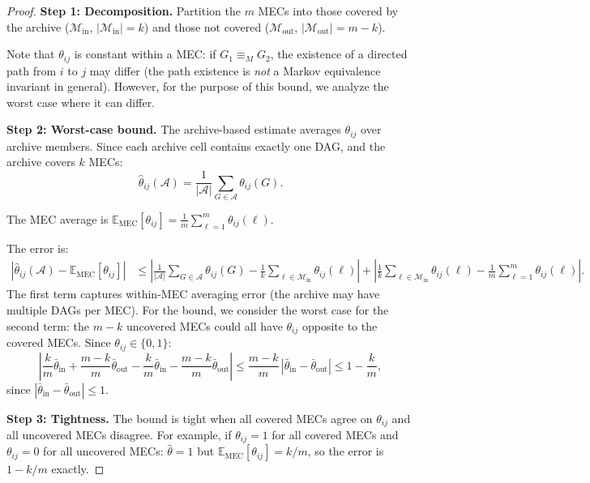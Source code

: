 \documentclass{article}
\theoremstyle{definition}
\theoremstyle{plain}
\theoremstyle{remark}
\begin{document}
\begin{proof}
\textbf{Step 1: Decomposition.}
Partition the $m$ MECs into those covered by the archive ($\mathcal{M}_{\text{in}}$,
$|\mathcal{M}_{\text{in}}| = k$) and those not covered
($\mathcal{M}_{\text{out}}$, $|\mathcal{M}_{\text{out}}| = m - k$).

Note that $\theta_{ij}$ is constant within a MEC: if $G_1 \equiv_M G_2$, the
existence of a directed path from $i$ to $j$ may differ (the path existence is
\emph{not} a Markov equivalence invariant in general). However, for the purpose
of this bound, we analyze the worst case where it can differ.

\textbf{Step 2: Worst-case bound.}
The archive-based estimate averages $\theta_{ij}$ over archive members. Since
each archive cell contains exactly one DAG, and the archive covers $k$ MECs:
$$\hat{\theta}_{ij}(\mathcal{A})
= \frac{1}{|\mathcal{A}|}\sum_{G \in \mathcal{A}} \theta_{ij}(G).$$

The MEC average is
$\mathbb{E}_{\mathrm{MEC}}[\theta_{ij}] = \frac{1}{m}\sum_{\ell=1}^m \theta_{ij}(\ell)$.

The error is:
\begin{align}
  |\hat{\theta}_{ij}(\mathcal{A}) - \mathbb{E}_{\mathrm{MEC}}[\theta_{ij}]|
  &\leq \left|\frac{1}{|\mathcal{A}|}\sum_{G \in \mathcal{A}} \theta_{ij}(G)
    - \frac{1}{k}\sum_{\ell \in \mathcal{M}_{\text{in}}} \theta_{ij}(\ell)\right|
    + \left|\frac{1}{k}\sum_{\ell \in \mathcal{M}_{\text{in}}} \theta_{ij}(\ell)
    - \frac{1}{m}\sum_{\ell=1}^m \theta_{ij}(\ell)\right|.
\end{align}
The first term captures within-MEC averaging error (the archive may have multiple
DAGs per MEC). For the bound, we consider the worst case for the second term:
the $m - k$ uncovered MECs could all have $\theta_{ij}$ opposite to the covered
MECs. Since $\theta_{ij} \in \{0, 1\}$:
$$\left|\frac{k}{m}\bar{\theta}_{\text{in}} + \frac{m-k}{m}\bar{\theta}_{\text{out}}
- \frac{k}{m}\bar{\theta}_{\text{in}} - \frac{m-k}{m}\bar{\theta}_{\text{out}}\right|
\leq \frac{m-k}{m}\,|\bar{\theta}_{\text{in}} - \bar{\theta}_{\text{out}}|
\leq 1 - \frac{k}{m},$$
since $|\bar{\theta}_{\text{in}} - \bar{\theta}_{\text{out}}| \leq 1$.

\textbf{Step 3: Tightness.}
The bound is tight when all covered MECs agree on $\theta_{ij}$ and all uncovered
MECs disagree. For example, if $\theta_{ij} = 1$ for all covered MECs and
$\theta_{ij} = 0$ for all uncovered MECs:
$\hat{\theta} = 1$ but $\mathbb{E}_{\mathrm{MEC}}[\theta_{ij}] = k/m$,
so the error is $1 - k/m$ exactly.


\end{proof}
\end{document}
